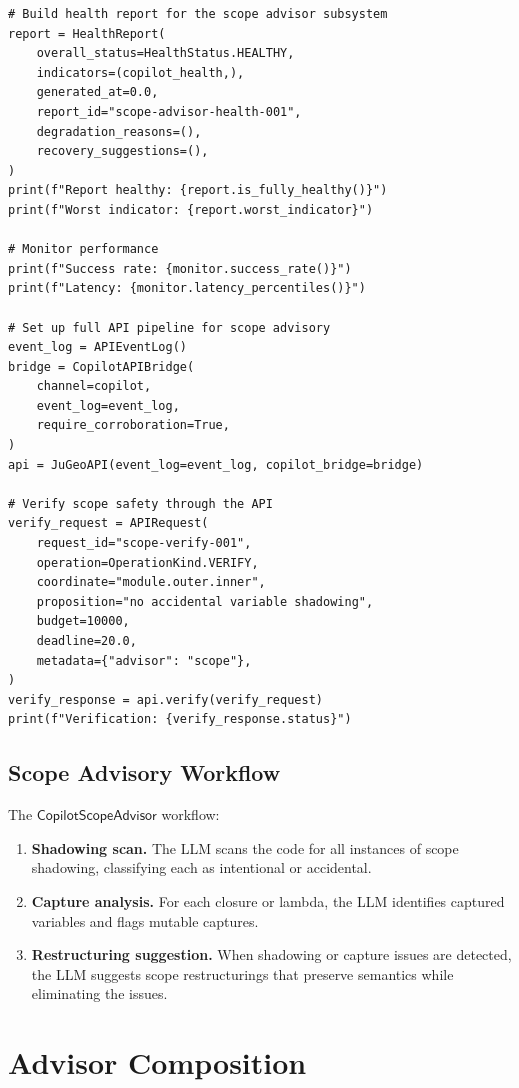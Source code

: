 \documentclass[11pt]{article}
\newcommand{\ScopeAdv}{\mathsf{CopilotScopeAdvisor}}
\begin{document}
\begin{lstlisting}[style=jugeo-python, caption={Scope advisor with CopilotAPIBridge and health monitoring.}, label=lst:scope-query]
# Build health report for the scope advisor subsystem
report = HealthReport(
    overall_status=HealthStatus.HEALTHY,
    indicators=(copilot_health,),
    generated_at=0.0,
    report_id="scope-advisor-health-001",
    degradation_reasons=(),
    recovery_suggestions=(),
)
print(f"Report healthy: {report.is_fully_healthy()}")
print(f"Worst indicator: {report.worst_indicator}")

# Monitor performance
print(f"Success rate: {monitor.success_rate()}")
print(f"Latency: {monitor.latency_percentiles()}")

# Set up full API pipeline for scope advisory
event_log = APIEventLog()
bridge = CopilotAPIBridge(
    channel=copilot,
    event_log=event_log,
    require_corroboration=True,
)
api = JuGeoAPI(event_log=event_log, copilot_bridge=bridge)

# Verify scope safety through the API
verify_request = APIRequest(
    request_id="scope-verify-001",
    operation=OperationKind.VERIFY,
    coordinate="module.outer.inner",
    proposition="no accidental variable shadowing",
    budget=10000,
    deadline=20.0,
    metadata={"advisor": "scope"},
)
verify_response = api.verify(verify_request)
print(f"Verification: {verify_response.status}")
\end{lstlisting}

\subsection{Scope Advisory Workflow}
\label{sec:scope:workflow}

The $\ScopeAdv$ workflow:

\begin{enumerate}
\item \textbf{Shadowing scan.}  The LLM scans the code for all
  instances of scope shadowing, classifying each as intentional
  or accidental.

\item \textbf{Capture analysis.}  For each closure or lambda,
  the LLM identifies captured variables and flags mutable captures.

\item \textbf{Restructuring suggestion.}  When shadowing or capture
  issues are detected, the LLM suggests scope restructurings that
  preserve semantics while eliminating the issues.
\end{enumerate}

\section{Advisor Composition}
\label{sec:composition}
\end{document}
